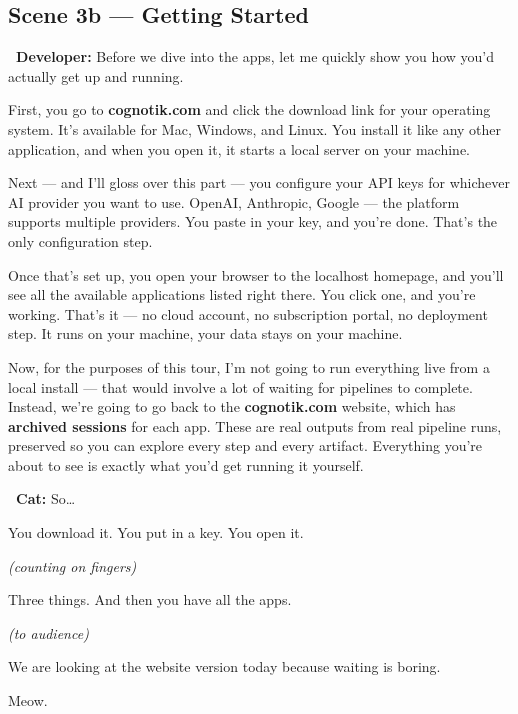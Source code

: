 \documentclass[12pt, letterpaper]{article}
\newcommand{\dev}{\textbf{\color{cogblue}\faIcon{laptop-code}\ Developer:}}
\newcommand{\cat}{\textbf{\color{catpink}\faIcon{cat}\ Cat:}}
\begin{document}
  \subsection{Scene 3b — Getting Started}

  \begin{developerbox}
    \dev{} Before we dive into the apps, let me quickly show you how you'd
    actually get up and running.

    \medskip
    First, you go to \textbf{cognotik.com} and click the download link for your
    operating system. It's available for Mac, Windows, and Linux. You install it
    like any other application, and when you open it, it starts a local server on
    your machine.

    \medskip
    Next — and I'll gloss over this part — you configure your API keys for
    whichever AI provider you want to use. OpenAI, Anthropic, Google — the
    platform supports multiple providers. You paste in your key, and you're done.
    That's the only configuration step.

    \medskip
    Once that's set up, you open your browser to the localhost homepage, and you'll
    see all the available applications listed right there. You click one, and
    you're working. That's it — no cloud account, no subscription portal, no
    deployment step. It runs on your machine, your data stays on your machine.

    \medskip
    Now, for the purposes of this tour, I'm not going to run everything live from
    a local install — that would involve a lot of waiting for pipelines to
    complete. Instead, we're going to go back to the \textbf{cognotik.com} website,
    which has \textbf{archived sessions} for each app. These are real outputs from
    real pipeline runs, preserved so you can explore every step and every artifact.
    Everything you're about to see is exactly what you'd get running it yourself.
  \end{developerbox}

  \begin{catbox}
    \cat{} \large So\ldots

    \medskip
    {\large You download it. You put in a key. You open it.}

    \medskip
    {\large\textit{(counting on fingers)}}

    \medskip
    {\large Three things. And then you have all the apps.}

    \medskip
    {\large\textit{(to audience)}}

    \medskip
    {\large We are looking at the website version today because waiting is boring.}

    \medskip
    {\large Meow.}
  \end{catbox}
\end{document}
